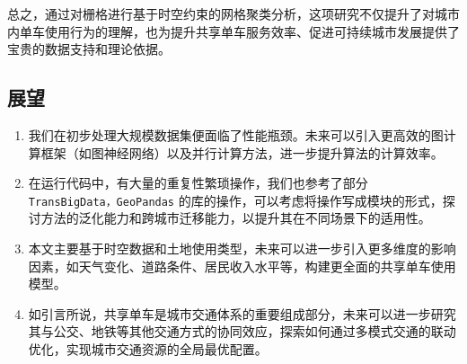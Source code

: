 \documentclass[12pt,a4paper,oneside]{ctexart}
\begin{document}
总之，通过对栅格进行基于时空约束的网格聚类分析，这项研究不仅提升了对城市内单车使用行为的理解，也为提升共享单车服务效率、促进可持续城市发展提供了宝贵的数据支持和理论依据。

\subsection{展望}
\begin{enumerate}
    \item 我们在初步处理大规模数据集便面临了性能瓶颈。未来可以引入更高效的图计算框架（如图神经网络）以及并行计算方法，进一步提升算法的计算效率。

    \item 在运行代码中，有大量的重复性繁琐操作，我们也参考了部分 \texttt{TransBigData，GeoPandas} 的库的操作，可以考虑将操作写成模块的形式，探讨方法的泛化能力和跨城市迁移能力，以提升其在不同场景下的适用性。
    
    \item 本文主要基于时空数据和土地使用类型，未来可以进一步引入更多维度的影响因素，如天气变化、道路条件、居民收入水平等，构建更全面的共享单车使用模型。

    \item  如引言所说，共享单车是城市交通体系的重要组成部分，未来可以进一步研究其与公交、地铁等其他交通方式的协同效应，探索如何通过多模式交通的联动优化，实现城市交通资源的全局最优配置。
\end{enumerate}



\newpage

\newpage

\appendix
\end{document}
